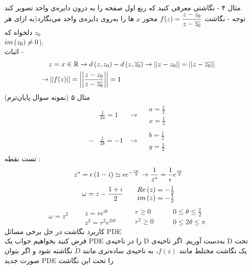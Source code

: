 \\
مثال ۴ - نگاشتی معرفی کنید که ربع اول صفحه را به درون دایره‌ی واحد تصویر کند.\\
توجه - نگاشت
$f(z)=\dfrac{z-z_0}{z-\overline{z_0}}$
محور
$x$
ها را به‌روی دایره‌ی واحد می‌نگارد(به ازای هر
$z_0$
دلخواه که\\
$im\left(z_0\right)\ne0$).\\
اثبات -
\[\begin{aligned}
	&z=x\in\mathbb{R}\rightarrow d\left(z,z_0\right)-d\left(z,\overline{z_0}\right)\rightarrow \left|\left| z-z_0 \right|\right|=\left|\left| z-\overline{z_0} \right|\right|
	\\ \rightarrow&
	\left|\left| f(z) \right|\right|=\left|\left| \frac{z-z_0}{z-\overline{z_0}} \right|\right|=1
\end{aligned}\]
مثال ۵ (نمونه سوال پایان‌ترم)\\
\[\begin{aligned}
	&\frac1{2a}=1&\rightarrow\quad\begin{matrix}
		a=\frac12\\ x=\frac12
	\end{matrix}
	\\ 
	-&\frac1{2b}=-1&\rightarrow\quad\begin{matrix}
		b=\frac12 \\ y=\frac12
	\end{matrix}
\end{aligned}\]
تست نقطه :
$$z^*=\epsilon\left(1-i\right)\simeq\epsilon e^{-\frac{i\pi}4}\rightarrow \frac1{z^*}=\frac1\epsilon e^{\frac{i\pi}4}$$
$$\omega=z-\frac{1+i}2\qquad \begin{matrix}
	Re\left(z\right)=-\frac12\\ im\left(z\right)=-\frac12
\end{matrix}$$
\[
\omega=z^2\qquad \begin{matrix}
	z=re^{i\theta}\\ z^2=r^2e^{2i\theta}
\end{matrix}\qquad
\begin{matrix}
	r\ge 0\\ r^2\ge0
\end{matrix}\qquad
\begin{matrix}
	0\le\theta\le\frac\pi2\\0\le2\theta\le\pi
\end{matrix}
\]
کاربرد نگاشت در حل برخی مسائل PDE\\
فرض کنید بخواهیم جواب یک PDE را در ناحیه‌ی D به‌دست آوریم. اگر ناحیه‌ی D تحت یک نگاشت مختلط مانند
$f(z)$،
به ناحیه‌ی ساده‌تری مانند
$\tilde{D}$
نگاشته شود و اگر بتوان صورت جدید
PDE
را تحت این نگاشت
